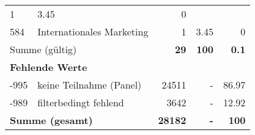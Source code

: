 \begin{longtable}{lXrrr}
       \num{1} &
       \num[round-mode=places,round-precision=2]{3.45} &
         \num[round-mode=places,round-precision=2]{0} \\

     584 &
     \multicolumn{1}{X}{ Internationales Marketing   } &


       \num{1} &
       \num[round-mode=places,round-precision=2]{3.45} &
         \num[round-mode=places,round-precision=2]{0} \\
     \midrule
     \multicolumn{2}{l}{Summe (gültig)} &
       \textbf{\num{29}} &
     \textbf{100} &
       \textbf{\num[round-mode=places,round-precision=2]{0.1}} \\
     \multicolumn{5}{l}{\textbf{Fehlende Werte}}\\
       -995 &
       keine Teilnahme (Panel) &
         \num{24511} &
        - &
         \num[round-mode=places,round-precision=2]{86.97} \\
       -989 &
       filterbedingt fehlend &
         \num{3642} &
        - &
         \num[round-mode=places,round-precision=2]{12.92} \\
     \midrule
     \multicolumn{2}{l}{\textbf{Summe (gesamt)}} &
          \textbf{\num{28182}} &
        \textbf{-} &
        \textbf{100} \\
     \bottomrule
     \end{longtable}
     
